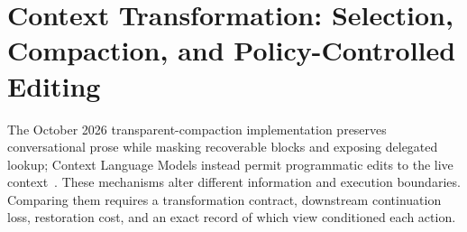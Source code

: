 \chapter{Context Transformation: Selection, Compaction, and Policy-Controlled Editing}\label{ch:C12}

The October 2026 transparent-compaction implementation preserves conversational prose while masking recoverable blocks and exposing delegated lookup; Context Language Models instead permit programmatic edits to the live context~\cite{woolford2026transparent,shao2026context}. These mechanisms alter different information and execution boundaries. Comparing them requires a transformation contract, downstream continuation loss, restoration cost, and an exact record of which view conditioned each action.









